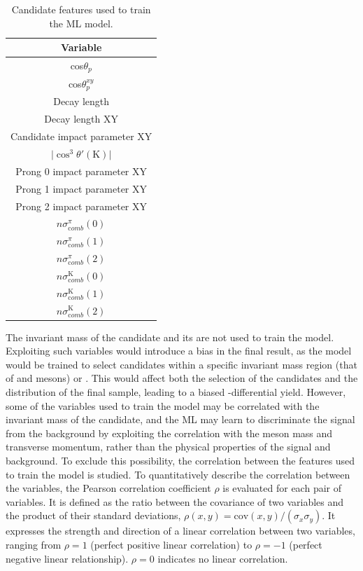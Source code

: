 \begin{table}[htb]
    \begin{center}
    \begin{tabular}{c}
         \toprule
         Variable\\
         \midrule         
         cos$\theta_{p}$\\
         cos$\theta_{p}^{xy}$\\
         Decay length\\
         Decay length XY\\
         Candidate impact parameter XY\\
         $\lvert \cos^{3}\theta'(\mathrm K)\rvert$\\
         Prong 0 impact parameter XY\\
         Prong 1 impact parameter XY\\
         Prong 2 impact parameter XY\\
         $n\sigma_{\mathrm comb}^{\pi}(0)$\\         
         $n\sigma_{\mathrm comb}^{\pi}(1)$\\
         $n\sigma_{\mathrm comb}^{\pi}(2)$\\
         $n\sigma_{\mathrm comb}^{\mathrm K}(0)$\\
         $n\sigma_{\mathrm comb}^{\mathrm K}(1)$\\
         $n\sigma_{\mathrm comb}^{\mathrm K}(2)$\\
         \bottomrule
    \end{tabular}
    \caption{Candidate features used to train the ML model.}
    \label{tab:ml_training_vars}
    \end{center}
\end{table}

The invariant mass of the candidate and its \pt are not used to train the model. Exploiting such variables would introduce a bias in the final result, as the model would be trained to select candidates within a specific invariant mass region (that of \ds and \dpl mesons) or \pt. This would affect both the selection of the candidates and the \pt distribution of the final sample, leading to a biased \pt-differential yield. However, some of the variables used to train the model may be correlated with the invariant mass of the candidate, and the ML may learn to discriminate the signal from the background by exploiting the correlation with the \ds meson mass and transverse momentum, rather than the physical properties of the signal and background. To exclude this possibility, the correlation between the features used to train the model is studied. To quantitatively describe the correlation between the variables, the Pearson correlation coefficient $\rho$ is evaluated for each pair of variables. It is defined as the ratio between the covariance of two variables and the product of their standard deviations, $\rho(x,y) = \mathrm{cov}(x,y)/(\sigma_{x}\sigma_{y})$. It expresses the strength and direction of a linear correlation between two variables, ranging from $\rho = 1$ (perfect positive linear correlation) to $\rho = -1$ (perfect negative linear relationship). $\rho = 0$ indicates no linear correlation.

